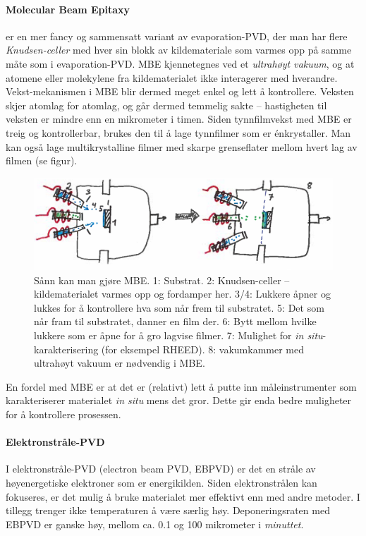 \paragraph{Molecular Beam Epitaxy} er en mer fancy og sammensatt variant av evaporation-PVD, der man har flere \emph{Knudsen-celler} med hver sin blokk av kildemateriale som varmes opp på samme måte som i evaporation-PVD. MBE kjennetegnes ved et \emph{ultrahøyt vakuum}, og at atomene eller molekylene fra kildematerialet ikke interagerer med hverandre. Vekst-mekanismen i MBE blir dermed meget enkel og lett å kontrollere. Veksten skjer atomlag for atomlag, og går dermed temmelig sakte -- hastigheten til veksten er mindre enn en mikrometer i timen. Siden tynnfilmvekst med MBE er treig og kontrollerbar, brukes den til å lage tynnfilmer som er énkrystaller. Man kan også lage multikrystalline filmer med skarpe grenseflater mellom hvert lag av filmen (se figur).
\begin{figure}[H]
\bmd\centering
\includegraphics[width=\linewidth]{metodefigs/mbe.png}
\caption{Sånn kan man gjøre MBE. 1: Substrat. 2: Knudsen-celler -- kildematerialet varmes opp og fordamper her. 3/4: Lukkere åpner og lukkes for å kontrollere hva som når frem til substratet. 5: Det som når fram til substratet, danner en film der. 6: Bytt mellom hvilke lukkere som er åpne for å gro lagvise filmer. 7: Mulighet for \emph{in situ}-karakterisering (for eksempel RHEED). 8: vakumkammer med ultrahøyt vakuum er nødvendig i MBE.}
\emd\end{figure}
En fordel med MBE er at det er (relativt) lett å putte inn måleinstrumenter som karakteriserer materialet \emph{in situ} mens det gror. Dette gir enda bedre muligheter for å kontrollere prosessen.

\paragraph{Elektronstråle-PVD} I elektronstråle-PVD (electron beam PVD, EBPVD) er det en stråle av høyenergetiske elektroner som er energikilden. Siden elektronstrålen kan fokuseres, er det mulig å bruke materialet mer effektivt enn med andre metoder. I tillegg trenger ikke temperaturen å være særlig høy. Deponeringsraten med EBPVD er ganske høy, mellom ca. 0.1 og 100 mikrometer i \emph{minuttet}. 


